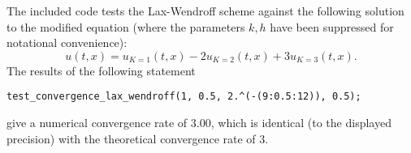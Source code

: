 \documentclass{article}
\begin{document}
\begin{itemize}
\begin{itemize}
The included code tests the Lax-Wendroff scheme against the following solution to the modified equation (where the parameters $k,h$ have been suppressed for notational convenience):
\begin{equation*}
u(t,x) = u_{K=1}(t,x) - 2 u_{K=2}(t,x) + 3 u_{K=3}(t,x).
\end{equation*}
The results of the following statement
\begin{verbatim}
test_convergence_lax_wendroff(1, 0.5, 2.^(-(9:0.5:12)), 0.5);
\end{verbatim}
give a numerical convergence rate of $3.00$, which is identical (to the displayed precision) with the theoretical convergence rate of $3$.

\end{itemize}

\end{itemize}
\end{document}

